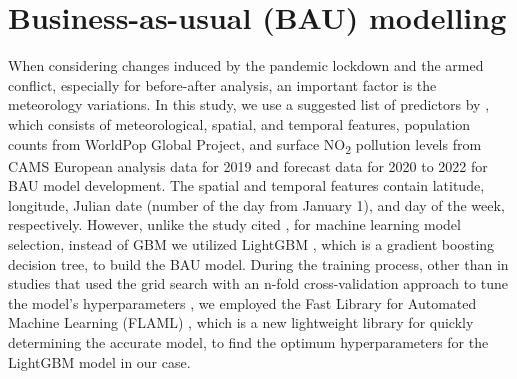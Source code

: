 \section{Business-as-usual (BAU) modelling} \label{chap3_bau}
When considering changes induced by the pandemic lockdown and the armed conflict, especially for before-after analysis, an important factor is the meteorology variations. In this study, we use a suggested list of predictors by \citep{barre2021estimating}, which consists of meteorological, spatial, and temporal features, population counts from WorldPop Global Project, and surface NO\textsubscript{2} pollution levels from CAMS European analysis data for 2019 and forecast data for 2020 to 2022 for BAU model development. The spatial and temporal features contain latitude, longitude, Julian date (number of the day from January 1), and day of the week, respectively. However, unlike the study cited \citep{barre2021estimating}, for machine learning model selection, instead of GBM we utilized LightGBM \citep{ke2017lightgbm}, which is a gradient boosting decision tree, to build the BAU model. During the training process, other than in studies that used the grid search with an n-fold cross-validation approach to tune the model’s hyperparameters \citep{barre2021estimating,petetin2020meteorology}, we employed the Fast Library for Automated Machine Learning (FLAML) \citep{wang2021flaml}, which is a new lightweight library for quickly determining the accurate model, to find the optimum hyperparameters for the LightGBM model in our case. \par
